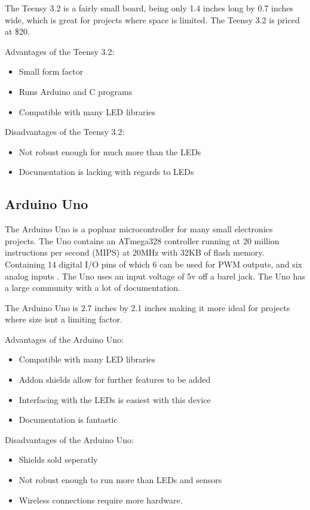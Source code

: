 	\vspace{5mm}
	\noindent The Teensy 3.2 is a fairly small board, being only 1.4 inches long
	by 0.7 inches wide, which is great for projects where space is limited. The
	Teensy 3.2 is priced at \$20.

	\vspace{5mm}
	\noindent Advantages of the Teensy 3.2:
	\begin{itemize}
		\item Small form factor
		\item Runs Arduino and C programs
		\item Compatible with many LED libraries
	\end{itemize}
	Disadvantages of the Teensy 3.2:
	\begin{itemize}
		\item Not robust enough for much more than the LEDs
		\item Documentation is lacking with regards to LEDs
	\end{itemize}
	\subsection{Arduino Uno}

	\vspace{5mm}
	\noindent The Arduino Uno is a popluar microcontroller for many small electronics
	projects. The Uno contains an ATmega328 controller running at 20 million
	instructions per second (MIPS) at 20MHz with 32KB of flash
	memory\cite[Pg 7]{atmel}. Containing 14 digital I/O pins of which 6
	can be used for PWM outputs, and six analog inputs \cite[Pg 7]{arduino}.
	The Uno uses an input voltage of 5v off a barel jack. The Uno has a large community with
	a lot of documentation.

	\vspace{5mm}
	\noindent The Arduino Uno is 2.7 inches by 2.1 inches making it more ideal for
	projects where size isnt a limiting factor.

	\vspace{5mm}
	Advantages of the Arduino Uno:
	\begin{itemize}
		\item Compatible with many LED libraries
		\item Addon shields allow for further features to be added
		\item Interfacing with the LEDs is easiest with this device
		\item Documentation is fantastic
	\end{itemize}
	Disadvantages of the Arduino Uno:
	\begin{itemize}
		\item Shields sold seperatly
		\item Not robust enough to run more than LEDs and sensors
		\item Wireless connections require more hardware.
	\end{itemize}
